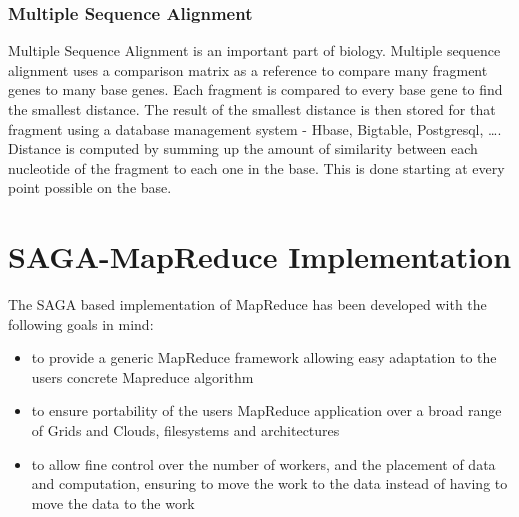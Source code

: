 \documentclass[conference,final]{IEEEtran}
\begin{document}
\subsubsection{Multiple Sequence Alignment}

Multiple Sequence Alignment is an important part of biology.  Multiple
sequence alignment uses a comparison matrix as a reference to compare
many fragment genes to many base genes.  Each fragment is compared to
every base gene to find the smallest distance.  The result of the
smallest distance is then stored for that fragment using a database
management system - Hbase, Bigtable, Postgresql, \ldots.  Distance is
computed by summing up the amount of similarity between each
nucleotide of the fragment to each one in the base.  This is done
starting at every point possible on the base.


\section{SAGA-MapReduce Implementation}

The SAGA based implementation of MapReduce has been developed with the
following goals in mind:

\begin{itemize}
\item to provide a generic MapReduce framework allowing easy
  adaptation to the users concrete Mapreduce algorithm
\item to ensure portability of the users MapReduce application over a
  broad range of Grids and Clouds, filesystems and architectures
\item to allow fine control over the number of workers, and the
  placement of data and computation, ensuring to move the work to the
  data instead of having to move the data to the work
\end{itemize}
\end{document}
